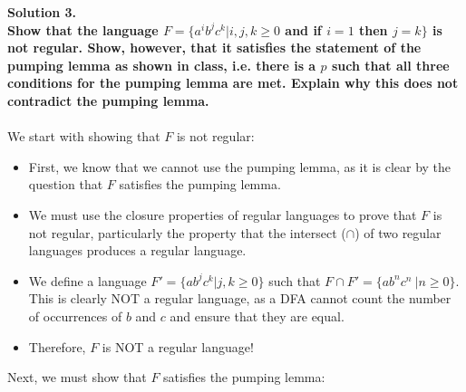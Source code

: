 \documentclass{article}
\begin{document}
\noindent \textbf{Solution 3. 
\\Show that the language \(F=\{a^ib^jc^k|i,j,k \geq 0\) and if \(i=1\) then \(j=k\}\) is not regular. Show, however, that it satisfies the statement of the pumping lemma as shown in class, i.e. there is a \(p\) such that all three conditions for the pumping lemma are met. Explain why this does not contradict the pumping lemma.}
\\
\\\noindent We start with showing that \(F\) is not regular:
\begin{itemize}
    \item First, we know that we cannot use the pumping lemma, as it is clear by the question that \(F\) satisfies the pumping lemma.
    \item We must use the closure properties of regular languages to prove that \(F\) is not regular, particularly the property that the intersect (\(\cap\)) of two regular languages produces a regular language.
    \item We define a language \(F' = \{a b^j c^k | j, k \geq 0\}\) such that \(F \cap F' = \{a b^n c^n\ | n \geq 0\}\). This is clearly NOT a regular language, as a DFA cannot count the number of occurrences of \(b\) and \(c\) and ensure that they are equal. 
    \item Therefore, \(F\) is NOT a regular language!
\end{itemize}
\noindent Next, we must show that \(F\) satisfies the pumping lemma:
\end{document}
